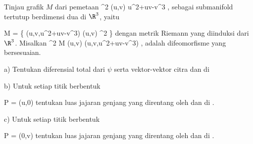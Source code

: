 {

Tinjau grafik $M$ dari pemetaan
\maabbeledisp {\varphi} {\R^2} {\R
} {(u,v)} { u^2+uv-v^3
} {,}
sebagai submanifold tertutup berdimensi dua di $\R^3$, yaitu

\mavergleichskettedisp
{\vergleichskette
{ M
}
{ =} { \left\{ (u,v,u^2+uv-v^3)  \mid  (u,v) \in \R^2         \right\}
}
{ } {
}
{ } {
}
{ } {
}
}
{}{}{}
dengan metrik Riemann yang diinduksi dari $\R^3$. Misalkan
\maabbeledisp {\psi} {\R^2} { M
} {(u,v)} { (u,v,u^2+uv-v^3)
} {,}
adalah difeomorfisme yang bersesuaian.

a) Tentukan diferensial total dari $\psi$ serta vektor-vektor citra
 dan
 di

b) Untuk setiap titik berbentuk

\mavergleichskette
{\vergleichskette
{ P
}
{ = }{ (u,0)
}
{  }{
}
{    }{
}
{   }{
}
}
{}{}{}
tentukan luas jajaran genjang yang direntang oleh
 dan
 di
.

c) Untuk setiap titik berbentuk

\mavergleichskette
{\vergleichskette
{ P
}
{ = }{ (0,v)
}
{  }{
}
{    }{
}
{   }{
}
}
{}{}{}
tentukan luas jajaran genjang yang direntang oleh
 dan
 di
.

}
